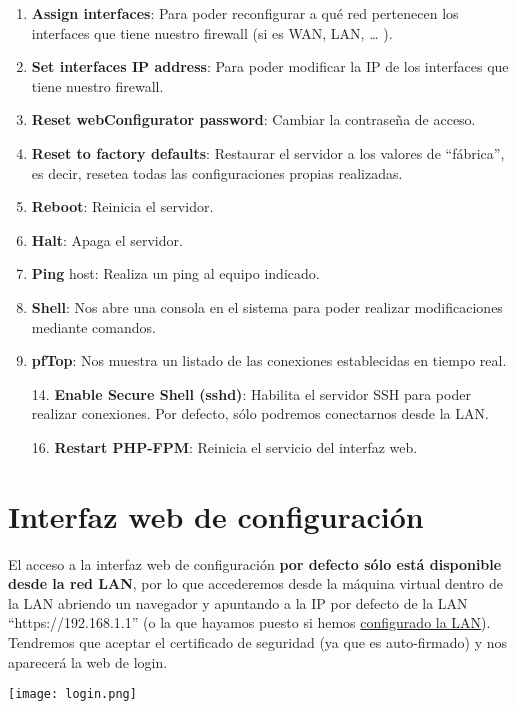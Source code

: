 \begin{enumerate}
    \item \textbf{Assign interfaces}: Para poder reconfigurar a qué red pertenecen los interfaces que tiene nuestro firewall (si es WAN, LAN, … ).
    \item \textbf{Set interfaces IP address}: Para poder modificar la IP de los interfaces que tiene nuestro firewall.
    \item \textbf{Reset webConfigurator password}: Cambiar la contraseña de acceso.
    \item \textbf{Reset to factory defaults}: Restaurar el servidor a los valores de “fábrica”, es decir, resetea todas las configuraciones propias realizadas.
    \item \textbf{Reboot}: Reinicia el servidor.
    \item \textbf{Halt}: Apaga el servidor.
    \item \textbf{Ping} host: Realiza un ping al equipo indicado.
    \item \textbf{Shell}: Nos abre una consola en el sistema para poder realizar modificaciones mediante comandos.
    \item \textbf{pfTop}: Nos muestra un listado de las conexiones establecidas en tiempo real.
    \item[14.] \textbf{Enable Secure Shell (sshd)}: Habilita el servidor SSH para poder realizar conexiones. Por defecto, sólo podremos conectarnos desde la LAN.
    \item[16.] \textbf{Restart PHP-FPM}: Reinicia el servicio del interfaz web.
\end{enumerate}

\section{Interfaz web de configuración}
El acceso a la interfaz web de configuración \textbf{por defecto sólo está disponible desde la red LAN}, por lo que accederemos desde la máquina virtual dentro de la LAN abriendo un navegador y apuntando a la IP por defecto de la LAN “https://192.168.1.1” (o la que hayamos puesto si hemos \hyperlink{configurar_lan_virtual}{configurado la LAN}). Tendremos que aceptar el certificado de seguridad (ya que es auto-firmado) y nos aparecerá la web de login.

\begin{center}
    \texttt{[image: login.png]}
\end{center}

